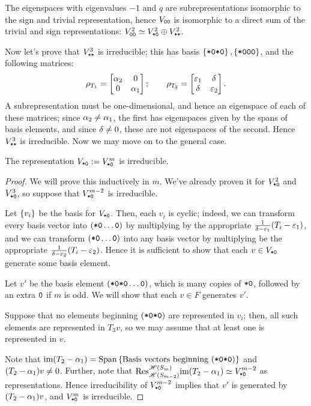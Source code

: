 \documentclass{amsart}
\begin{document}
The eigenspaces with eigenvalues $-1$ and $q$ are subrepresentations isomorphic to the sign and trivial representation, hence $V_{\texttt{0}\texttt{0}}$ is isomorphic to a direct sum of the trivial and sign representations: $V^2_{\texttt{0}\texttt{0}} \simeq V^2_{\texttt{*}\texttt{0}} \oplus V^2_{\texttt{*}\texttt{*}}$. 

Now let's prove that $V^3_{\texttt{*}\texttt{*}}$ is irreducible;
this has basis $\left\{ \texttt{*}\texttt{0}\texttt{*}\texttt{0} \right\}, \left\{ \texttt{*}\texttt{0}\texttt{0}\texttt{0} \right\}$, and the following matrices:
\[
  \rho_{T_1} = \begin{bmatrix}
    \alpha_2 & 0\\
    0 & \alpha_1
  \end{bmatrix}; \hspace{20pt}
  \rho_{T_2} = \begin{bmatrix}
    \varepsilon_1 & \delta\\
    \delta & \varepsilon_2
  \end{bmatrix}.
\]
A subrepresentation must be one-dimensional, and hence an eigenspace of each of these matrices;
since $\alpha_2 \neq \alpha_1$, the first has eigenspaces given by the spans of basis elements, and since $\delta \neq 0$, these are not eigenspaces of the second.
Hence $V^3_{\texttt{*}\texttt{*}}$ is irreducible.
Now we may move on to the general case.
\begin{proposition}
  The representation $V_{\texttt{*}\texttt{0}} := V^m_{\texttt{*}\texttt{0}}$ is irreducible.
\end{proposition}
\begin{proof}
  We will prove this inductively in $m$.
  We've already proven it for $V^2_{\texttt{*}\texttt{0}}$ and $V^3_{\texttt{*}\texttt{0}}$, so suppose that $V^{m-2}_{\texttt{*}\texttt{0}}$ is irreducible.
  
  Let $\left\{ v_i \right\}$ be the basis for $V_{\texttt{*}\texttt{0}}$.
  Then, each $v_i$ is cyclic; indeed, we can transform every basis vector into $(\texttt{*}\texttt{0} \dots \texttt{0})$ by multiplying by the appropriate $\frac{1}{\delta-\varepsilon_1}(T_i - \varepsilon_1)$, and we can transform $(\texttt{*}\texttt{0} \dots \texttt{0})$ into any basis vector by multiplying be the appropriate $\frac{1}{\delta-\varepsilon_2}(T_i - \varepsilon_2)$.
  Hence it is sufficient to show that each $v \in V_{\texttt{*}\texttt{0}}$ generate some basis element.

  Let $v'$ be the basis element $(\texttt{*}\texttt{0}\texttt{*}\texttt{0}\dots \texttt{0})$, which is many copies of $\texttt{*}\texttt{0}$, followed by an extra $\texttt{0}$ if $m$ is odd.
  We will show that each $v \in F$ generates $v'$.

  Suppose that no elements beginning $(\texttt{*}\texttt{0}\texttt{*}\texttt{0})$ are represented in $v_i$;
  then, all such elements are represented in $T_3v$, so we may assume that at least one is represented in $v$.

  Note that $\text{im} (T_2 - \alpha_1) = \text{Span}\left\{ \text{Basis vectors beginning }(\texttt{*}\texttt{0}\texttt{*}\texttt{0}) \right\}$ and $(T_2 - \alpha_1)v \neq 0$.
  Further, note that $\text{Res}_{\mathscr{H}(S_{m-2})}^{\mathscr{H}(S_m)} \text{im} (T_2 - \alpha_1) \simeq V^{m-2}_{\texttt{*}\texttt{0}}$ as representations.
  Hence irreducibility of $V^{m-2}_{\texttt{*}\texttt{0}}$ implies that $v'$ is generated by $(T_2 - \alpha_1)v$, and $V^m_{\texttt{*}\texttt{0}}$ is irreducible.
\end{proof}
\end{document}
